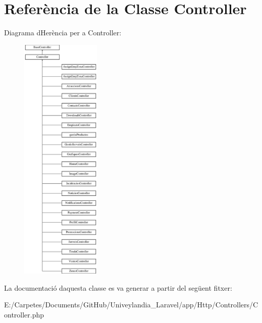 \hypertarget{class_app_1_1_http_1_1_controllers_1_1_controller}{}\section{Referència de la Classe Controller}
\label{class_app_1_1_http_1_1_controllers_1_1_controller}
Diagrama d\textquotesingle{}Herència per a Controller\+:\begin{figure}[H]
\begin{center}
\leavevmode
\includegraphics[height=12.000000cm]{class_app_1_1_http_1_1_controllers_1_1_controller}
\end{center}
\end{figure}


La documentació d\textquotesingle{}aquesta classe es va generar a partir del següent fitxer\+:\begin{DoxyCompactItemize}
\item 
E\+:/\+Carpetes/\+Documents/\+Git\+Hub/\+Univeylandia\+\_\+\+Laravel/app/\+Http/\+Controllers/Controller.\+php\end{DoxyCompactItemize}
